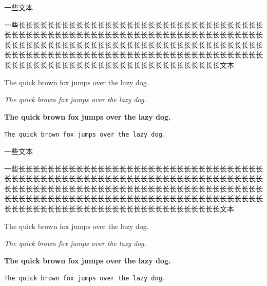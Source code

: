 一些文本

一些长长长长长长长长长长长长长长长长长长长长长长长长长长长长长长长长长长长长长长长长长长长长长长长长长长长长长长长长长长长长长长长长长长长长长长长长长长长长长长长长长长长长长长长长长长长长长长长长长长长长长长长长长长长长长长长长长长长长长长长长长长长长长长长长长长长长长长长长长长长长长长长长长长长长长长长长长长长长长长长长长长长长长长长长长长长长文本

The quick brown fox jumps over the lazy dog.

\textit{The quick brown fox jumps over the lazy dog.}

\textbf{The quick brown fox jumps over the lazy dog.}

\texttt{The quick brown fox jumps over the lazy dog.}

一些文本

一些长长长长长长长长长长长长长长长长长长长长长长长长长长长长长长长长长长长长长长长长长长长长长长长长长长长长长长长长长长长长长长长长长长长长长长长长长长长长长长长长长长长长长长长长长长长长长长长长长长长长长长长长长长长长长长长长长长长长长长长长长长长长长长长长长长长长长长长长长长长长长长长长长长长长长长长长长长长长长长长长长长长长长长长长长长长长文本

The quick brown fox jumps over the lazy dog.

\textit{The quick brown fox jumps over the lazy dog.}

\textbf{The quick brown fox jumps over the lazy dog.}

\texttt{The quick brown fox jumps over the lazy dog.}
